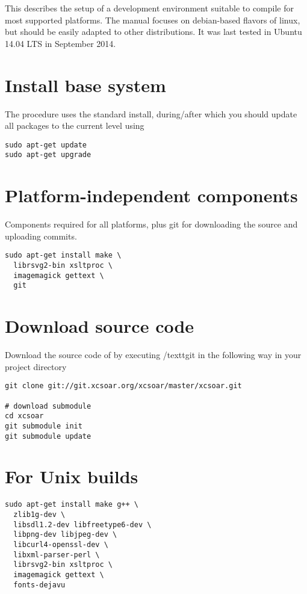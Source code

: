 This describes the setup of a development environment suitable to compile \xc for most supported platforms. The manual focuses on debian-based flavors of linux, but should be easily adapted to other distributions. It was last tested in Ubuntu 14.04 LTS in September 2014.

\section{Install base system}
The procedure uses the standard install, during/after which you should update all packages to the current level using

\begin{verbatim}
sudo apt-get update
sudo apt-get upgrade
\end{verbatim}

\section{Platform-independent components}

Components required for all platforms, plus git for downloading the source and uploading commits.

\begin{verbatim}
sudo apt-get install make \
  librsvg2-bin xsltproc \
  imagemagick gettext \
  git
\end{verbatim}

\section{Download source code}

Download the source code of \xc by executing /textt{git} in the following way in your project directory
\begin{verbatim}
git clone git://git.xcsoar.org/xcsoar/master/xcsoar.git

# download submodule
cd xcsoar
git submodule init
git submodule update
\end{verbatim}


\section{For Unix builds}
\begin{verbatim}
sudo apt-get install make g++ \
  zlib1g-dev \
  libsdl1.2-dev libfreetype6-dev \
  libpng-dev libjpeg-dev \
  libcurl4-openssl-dev \
  libxml-parser-perl \
  librsvg2-bin xsltproc \
  imagemagick gettext \
  fonts-dejavu
\end{verbatim}

